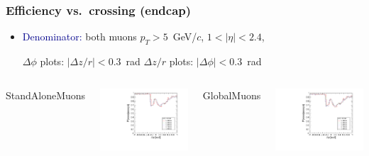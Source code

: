 \documentclass[compress]{beamer}
\begin{document}
\begin{frame}
\frametitle{Efficiency vs.\ crossing (endcap)}
\begin{itemize}
\item \textcolor{darkblue}{Denominator:} both muons $p_T > 5$~GeV/$c$, $1 < |\eta| < 2.4$,

$\Delta \phi$ plots: $|\Delta z/r| < 0.3$~rad \hfill $\Delta z/r$ plots: $|\Delta \phi| < 0.3$~rad
\end{itemize}

\vfill
\begin{columns}
\centering StandAloneMuons

\includegraphics[width=\linewidth]{barrel_dphi_StandAloneMuon.pdf}

\centering GlobalMuons

\includegraphics[width=\linewidth]{barrel_dphi_GlobalMuon.pdf}


\end{columns}
\end{frame}
\end{document}
